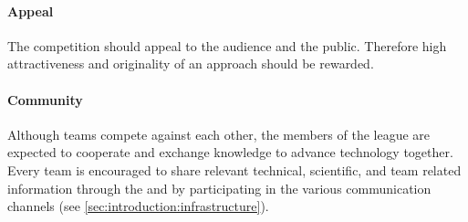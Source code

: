 \paragraph{Appeal}
\label{sec:concepts:appeal}
The competition should appeal to the audience and the public. Therefore high attractiveness and originality of an approach should be rewarded.

\paragraph{Community}
\label{sec:concepts:community}
Although teams compete against each other, the members of the \AtHome{} league are expected to cooperate and exchange knowledge to advance technology together. Every team is encouraged to share relevant technical, scientific, and team related information through the \TDP{} and by participating in the various communication channels (see \ref{sec:introduction:infrastructure}).


